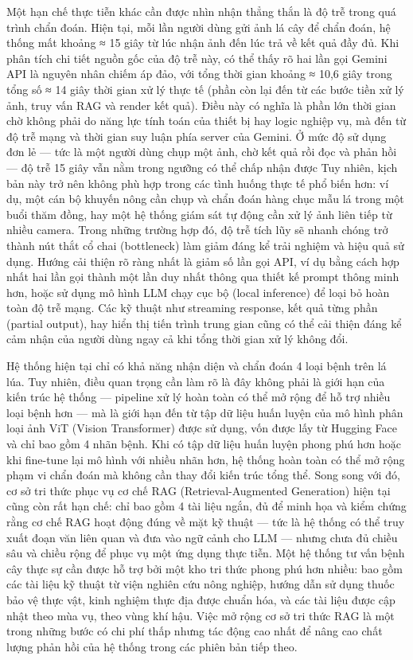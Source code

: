 Một hạn chế thực tiễn khác cần được nhìn nhận thẳng thắn là độ trễ trong quá trình chẩn đoán. Hiện tại, mỗi lần người dùng gửi ảnh lá cây để chẩn đoán, hệ thống mất khoảng ≈ 15 giây từ lúc nhận ảnh đến lúc trả về kết quả đầy đủ. Khi phân tích chi tiết nguồn gốc của độ trễ này, có thể thấy rõ hai lần gọi Gemini API là nguyên nhân chiếm áp đảo, với tổng thời gian khoảng ≈ 10,6 giây trong tổng số ≈ 14 giây thời gian xử lý thực tế (phần còn lại đến từ các bước tiền xử lý ảnh, truy vấn RAG và render kết quả). Điều này có nghĩa là phần lớn thời gian chờ không phải do năng lực tính toán của thiết bị hay logic nghiệp vụ, mà đến từ độ trễ mạng và thời gian suy luận phía server của Gemini. Ở mức độ sử dụng đơn lẻ — tức là một người dùng chụp một ảnh, chờ kết quả rồi đọc và phản hồi — độ trễ 15 giây vẫn nằm trong ngưỡng có thể chấp nhận được Tuy nhiên, kịch bản này trở nên không phù hợp trong các tình huống thực tế phổ biến hơn: ví dụ, một cán bộ khuyến nông cần chụp và chẩn đoán hàng chục mẫu lá trong một buổi thăm đồng, hay một hệ thống giám sát tự động cần xử lý ảnh liên tiếp từ nhiều camera. Trong những trường hợp đó, độ trễ tích lũy sẽ nhanh chóng trở thành nút thắt cổ chai (bottleneck) làm giảm đáng kể trải nghiệm và hiệu quả sử dụng. Hướng cải thiện rõ ràng nhất là giảm số lần gọi API, ví dụ bằng cách hợp nhất hai lần gọi thành một lần duy nhất thông qua thiết kế prompt thông minh hơn, hoặc sử dụng mô hình LLM chạy cục bộ (local inference) để loại bỏ hoàn toàn độ trễ mạng. Các kỹ thuật như streaming response, kết quả từng phần (partial output), hay hiển thị tiến trình trung gian cũng có thể cải thiện đáng kể cảm nhận của người dùng ngay cả khi tổng thời gian xử lý không đổi.

Hệ thống hiện tại chỉ có khả năng nhận diện và chẩn đoán 4 loại bệnh trên lá lúa. Tuy nhiên, điều quan trọng cần làm rõ là đây không phải là giới hạn của kiến trúc hệ thống — pipeline xử lý hoàn toàn có thể mở rộng để hỗ trợ nhiều loại bệnh hơn — mà là giới hạn đến từ tập dữ liệu huấn luyện của mô hình phân loại ảnh ViT (Vision Transformer) được sử dụng, vốn được lấy từ Hugging Face và chỉ bao gồm 4 nhãn bệnh. Khi có tập dữ liệu huấn luyện phong phú hơn hoặc khi fine-tune lại mô hình với nhiều nhãn hơn, hệ thống hoàn toàn có thể mở rộng phạm vi chẩn đoán mà không cần thay đổi kiến trúc tổng thể. Song song với đó, cơ sở tri thức phục vụ cơ chế RAG (Retrieval-Augmented Generation) hiện tại cũng còn rất hạn chế: chỉ bao gồm 4 tài liệu ngắn, đủ để minh họa và kiểm chứng rằng cơ chế RAG hoạt động đúng về mặt kỹ thuật — tức là hệ thống có thể truy xuất đoạn văn liên quan và đưa vào ngữ cảnh cho LLM — nhưng chưa đủ chiều sâu và chiều rộng để phục vụ một ứng dụng thực tiễn. Một hệ thống tư vấn bệnh cây thực sự cần được hỗ trợ bởi một kho tri thức phong phú hơn nhiều: bao gồm các tài liệu kỹ thuật từ viện nghiên cứu nông nghiệp, hướng dẫn sử dụng thuốc bảo vệ thực vật, kinh nghiệm thực địa được chuẩn hóa, và các tài liệu được cập nhật theo mùa vụ, theo vùng khí hậu. Việc mở rộng cơ sở tri thức RAG là một trong những bước có chi phí thấp nhưng tác động cao nhất để nâng cao chất lượng phản hồi của hệ thống trong các phiên bản tiếp theo.

